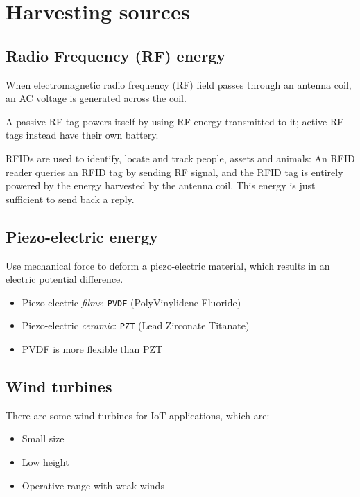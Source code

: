 \section{Harvesting sources}
\subsection{Radio Frequency (RF) energy}
When electromagnetic radio frequency (RF) field passes through an
antenna coil, an AC voltage is generated across the coil.

A passive RF tag powers itself by using RF energy transmitted to it;
active RF tags instead have their own battery.

RFIDs are used to identify, locate and track people, assets and animals:
An RFID reader queries an RFID tag by sending RF signal, and the RFID tag is entirely powered by the energy harvested by the antenna coil.
This energy is just sufficient to send back a reply.

\subsection{Piezo-electric energy}
Use mechanical force to deform a piezo-electric material,
which results in an electric potential difference.
\begin{itemize}
   \item Piezo-electric \textit{films}: \texttt{PVDF} (PolyVinylidene Fluoride)
   \item Piezo-electric \textit{ceramic}: \texttt{PZT} (Lead Zirconate Titanate)
   \item[] PVDF is more flexible than PZT
\end{itemize}

\subsection{Wind turbines}
There are some wind turbines for IoT applications, which are:
\begin{itemize}
   \item Small size
   \item Low height
   \item Operative range with weak winds
\end{itemize}

